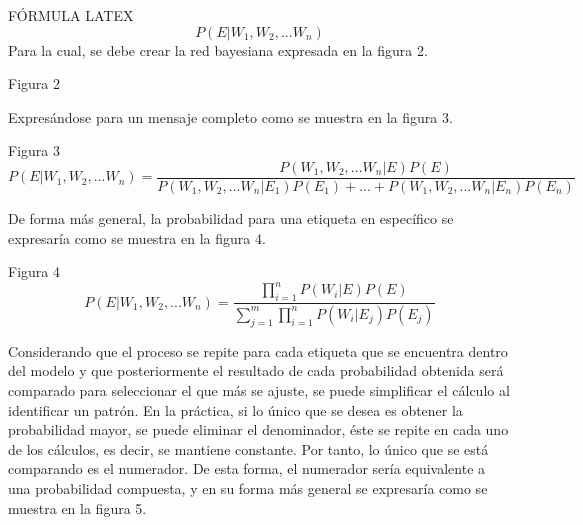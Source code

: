 \documentclass[sigconf]{acmart}
\begin{document}
FÓRMULA LATEX 
\begin{equation}
\label{eq:bayes1}
P(E|W_1, W_2, ... W_n)
\end{equation}
Para la cual, se debe crear la red bayesiana expresada en la figura 2.
\begin{center}
Figura 2
\end{center}
Expresándose para un mensaje completo como se muestra en la figura 3.
\begin{center}
Figura 3
\begin{equation}
\label{eq:bayes2}
P(E|W_1, W_2, ... W_n) = 
\frac {P(W_1, W_2, ... W_n|E)P(E)} {P(W_1, W_2, ... W_n|E_1)P(E_1)+... +P(W_1, W_2, ... W_n|E_n)P(E_n)}
\end{equation}
\end{center}
De forma más general, la probabilidad para una etiqueta en específico se expresaría como se muestra en la figura 4.

Figura 4
\begin{equation}
\label{eq:bayes3}
P(E|W_1, W_2, ... W_n) = \frac {\prod_{i=1}^{n} P(W_i|E) P(E)} {\sum_{j=1}^{m} \prod_{i=1}^{n} P(W_i|E_j) P(E_j)}
\end{equation}

Considerando que el proceso se repite para cada etiqueta que se encuentra dentro del modelo y que posteriormente el resultado de cada probabilidad obtenida será comparado para seleccionar el que más se ajuste, se puede simplificar el cálculo al identificar un patrón.  En la práctica, si lo único que se desea es obtener la probabilidad mayor, se puede eliminar el denominador, éste se repite en cada uno de los cálculos, es decir, se mantiene constante. Por tanto, lo único que se está comparando es el numerador. De esta forma, el numerador sería equivalente a una probabilidad compuesta, y en su forma más general se expresaría como se muestra en la figura 5.\citep{Lee}\citep{Lopez}
\end{document}
